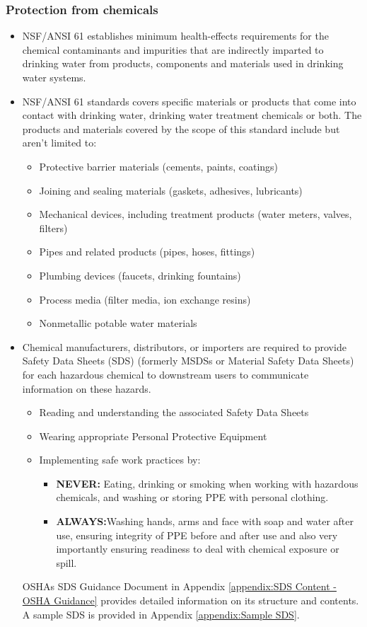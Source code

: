 \subsubsection{Protection from chemicals}
\begin{itemize}
\item NSF/ANSI 61  establishes minimum health-effects requirements for the chemical contaminants and impurities that are indirectly imparted to drinking water from products, components and materials used in drinking water systems.
\item NSF/ANSI 61 standards covers specific materials or products that come into contact with drinking water, drinking water treatment chemicals or both. The products and materials covered by the scope of this standard include but aren’t limited to:
\begin{itemize}
\item Protective barrier materials (cements, paints, coatings)
\item Joining and sealing materials (gaskets, adhesives, lubricants)
\item Mechanical devices, including treatment products (water meters, valves, filters)
\item Pipes and related products (pipes, hoses, fittings)
\item Plumbing devices (faucets, drinking fountains)
\item Process media (filter media, ion exchange resins)
\item Nonmetallic potable water materials
\end{itemize}
\item Chemical manufacturers, distributors, or importers are required to provide Safety Data Sheets (SDS)  (formerly MSDSs or Material Safety Data Sheets) for each hazardous chemical to downstream users to communicate information on these hazards.
\begin{itemize}
\item Reading and understanding the associated Safety Data Sheets
\item Wearing appropriate Personal Protective Equipment
\item Implementing safe work practices by:
\begin{itemize}
\item \textbf{NEVER:} Eating, drinking or smoking when working with hazardous chemicals, and washing or storing PPE with personal clothing.
\item \textbf{ALWAYS:}Washing hands, arms and face with soap and water after use, ensuring integrity of PPE before and after use and also very importantly ensuring  readiness to deal with chemical exposure or spill.
\end{itemize}
\end{itemize}
OSHAs SDS Guidance Document in Appendix \ref{appendix:SDS Content - OSHA Guidance} provides detailed information on its structure and contents. A sample SDS is provided in Appendix \ref{appendix:Sample SDS}.
\end{itemize}
